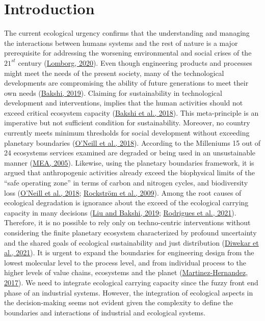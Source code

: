 \documentclass[]{elsarticle} %
\begin{document}
\linenumbers

\hypertarget{introduction}{%
\section{Introduction}\label{introduction}}

The current ecological urgency confirms that the understanding and managing the interactions between humans systems and the rest of nature is a major prerequisite for addressing the worsening environmental and social crises of the \(21^{st}\) century (\protect\hyperlink{ref-Lomborg2020}{Lomborg, 2020}).
Even though engineering products and processes might meet the needs of the present society, many of the technological developments are compromising the ability of future generations to meet their own needs (\protect\hyperlink{ref-Bakshi2019a}{Bakshi, 2019}).
Claiming for sustainability in technological development and interventions, implies that the human activities should not exceed critical ecosystem capacity (\protect\hyperlink{ref-Bakshi2018}{Bakshi et al., 2018}).
This meta-principle is an imperative but not sufficient condition for sustainability.
Moreover, no country currently meets minimum thresholds for social development without exceeding planetary boundaries (\protect\hyperlink{ref-ONeill2018}{O'Neill et al., 2018}).
According to the Milleniums 15 out of 24 ecosystems services examined are degraded or being used in an unsustainable manner (\protect\hyperlink{ref-MEA2005}{MEA, 2005}).
Likewise, using the planetary boundaries framework, it is argued that anthropogenic activities already exceed the biophysical limits of the ``safe operating zone'' in terms of carbon and nitrogen cycles, and biodiversity loss (\protect\hyperlink{ref-ONeill2018}{O'Neill et al., 2018}; \protect\hyperlink{ref-Rockstrom2009}{Rockström et al., 2009}).
Among the root causes of ecological degradation is ignorance about the exceed of the ecological carrying capacity in many decisions (\protect\hyperlink{ref-Liu2019g}{Liu and Bakshi, 2019}; \protect\hyperlink{ref-Rodrigues2021}{Rodrigues et al., 2021}).
Therefore, it is no possible to rely only on techno-centric interventions without considering the finite planetary ecosystem characterized by profound uncertainty and the shared goals of ecological sustainability and just distribution (\protect\hyperlink{ref-Diwekar2021}{Diwekar et al., 2021}).
It is urgent to expand the boundaries for engineering design from the lowest molecular level to the process level, and from individual process to the higher levels of value chains, ecosystems and the planet (\protect\hyperlink{ref-Martinez-Hernandez2017}{Martinez-Hernandez, 2017}).
We need to integrate ecological carrying capacity since the fuzzy front end phase of an industrial systems.
However, the integration of ecological aspects in the decision-making seems not evident given the complexity to define the boundaries and interactions of industrial and ecological systems.
\end{document}
